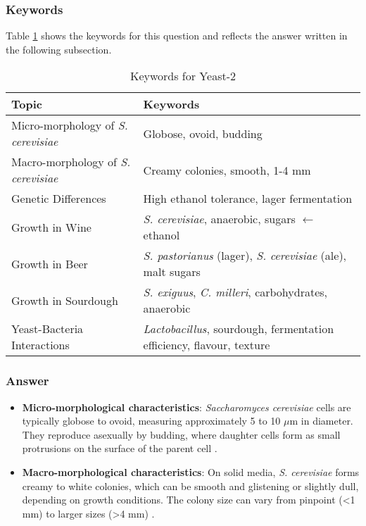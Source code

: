 \subsubsection*{Keywords}
Table \ref{tab:KW-Yeast2} shows the keywords for this question and reflects the answer written in the following subsection.
\begin{table}[h]
    \centering
    \caption{Keywords for Yeast-2} 
    \label{tab:KW-Yeast2}
    \begin{tabular}{l|l}
        \textbf{Topic} & \textbf{Keywords} \\
        \hline
        Micro-morphology of \textit{S. cerevisiae} & Globose, ovoid, budding \\
        Macro-morphology of \textit{S. cerevisiae} & Creamy colonies, smooth, 1-4 mm \\
        Genetic Differences & High ethanol tolerance, lager fermentation \\
        Growth in Wine & \textit{S. cerevisiae}, anaerobic, sugars $\leftarrow$ ethanol \\
        Growth in Beer & \textit{S. pastorianus} (lager), \textit{S. cerevisiae} (ale), malt sugars \\
        Growth in Sourdough & \textit{S. exiguus}, \textit{C. milleri}, carbohydrates, anaerobic \\
        Yeast-Bacteria Interactions & \textit{Lactobacillus}, sourdough, fermentation efficiency, flavour, texture \\
    \end{tabular}
\end{table}

\subsubsection*{Answer}
\begin{itemize}
    \item \textbf{Micro-morphological characteristics}: \textit{Saccharomyces cerevisiae} cells are typically globose to ovoid, measuring approximately 5 to 10 $\mu$m in diameter. They reproduce asexually by budding, where daughter cells form as small protrusions on the surface of the parent cell \cite*{LabManual}.
    \item \textbf{Macro-morphological characteristics}: On solid media, \textit{S. cerevisiae} forms creamy to white colonies, which can be smooth and glistening or slightly dull, depending on growth conditions. The colony size can vary from pinpoint (<1 mm) to larger sizes (>4 mm) \cite*{LabManual}.
\end{itemize}

